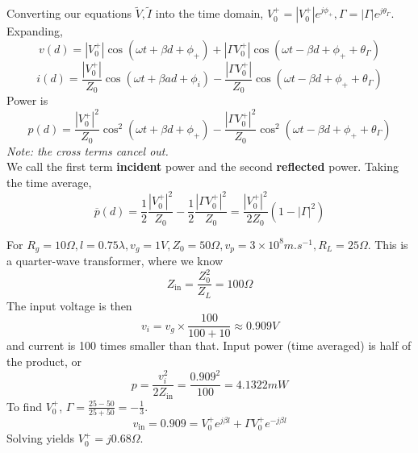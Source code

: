 \documentclass[12pt]{article}
\begin{document}
Converting our equations $\tilde V, \tilde I$ into the time domain, $V_0^+ = |V_0^+|e^{j\phi_+}, \Gamma = |\Gamma|e^{j\theta_\Gamma}$. Expanding,
$$v(d) = |V_0^+|\cos(\omega t + \beta d + \phi_+) + |\Gamma V_0^+|\cos(\omega t - \beta d + \phi_+ + \theta_\Gamma)$$
$$i(d) = \frac{|V_0^+|}{Z_0} \cos(\omega t + \beta ad + \phi_i) - \frac{|\Gamma V_0^+|}{Z_0} \cos(\omega t - \beta d + \phi_+ + \theta_\Gamma)$$
Power is
$$p(d) = \frac{|V_0^+|^2}{Z_0} \cos^2(\omega t + \beta d + \phi_+) - \frac{|\Gamma V_0^+|^2}{Z_0} \cos^2(\omega t - \beta d + \phi_+ + \theta_\Gamma)$$
\textit{Note: the cross terms cancel out.} \\
We call the first term \textbf{incident} power and the second \textbf{reflected} power. Taking the time average,
$$\overline p(d) = \frac{1}{2} \frac{|V_0^+|^2}{Z_0} - \frac{1}{2} \frac{|\Gamma V_0^+|^2}{Z_0} = \frac{|V_0^+|^2}{2Z_0} (1 - |\Gamma|^2)$$

\begin{ex}
    For $R_g = 10\unit{\Omega}, l = 0.75\lambda, v_g = 1\unit{V}, Z_0 = 50\unit{\Omega}, v_p = 3 \times 10^8 \unit{m.s^{-1}}, R_L = 25\unit{\Omega}$. This is a quarter-wave transformer, where we know
    $$Z_{\text{in}} = \frac{Z_0^2}{Z_L} = 100\unit{\Omega}$$
    The input voltage is then
    $$v_i = v_g \times \frac{100}{100+10} \approx 0.909\unit{V}$$
    and current is 100 times smaller than that. Input power (time averaged) is half of the product, or 
    $$p = \frac{v_i^2}{2Z_{\text{in}}} = \frac{0.909^2}{100} = 4.1322 \unit{mW}$$
    To find $V_0^+$, $\Gamma = \frac{25-50}{25+50} = -\frac{1}{3}$.
    $$v_{\text{in}} = 0.909 = V_0^+ e^{j\beta l} + \Gamma V_0^+ e^{-j\beta l}$$
    Solving yields $V_0^+ = j0.68\unit{\Omega}$.
\end{ex}
\end{document}
